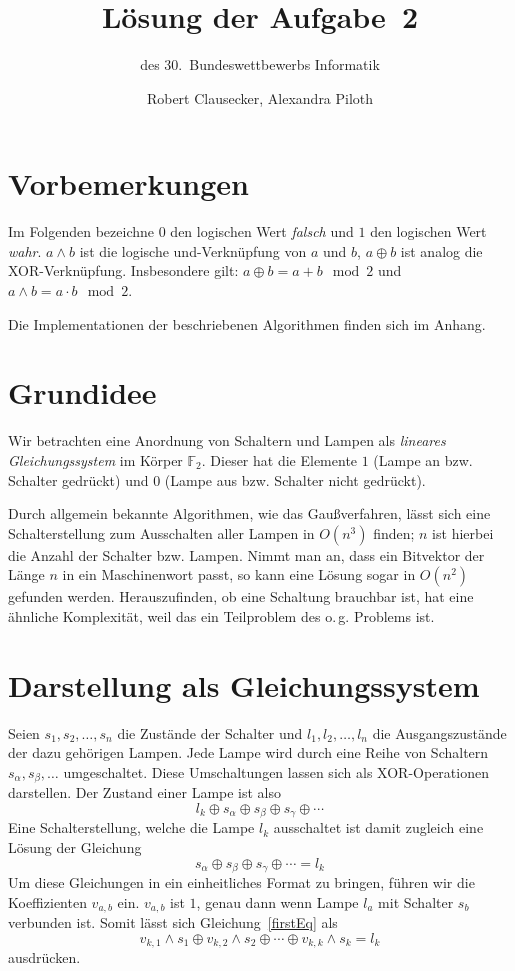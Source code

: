 \documentclass{scrartcl}
\title{Lösung der Aufgabe~2}
\subtitle{des 30.~Bundeswettbewerbs Informatik}
\author{Robert Clausecker, Alexandra Piloth}
\newcommand{\ftwo}{\ensuremath{\mathbb F_2}}
\newcommand{\bigO}{O}
\newcommand{\xor}{\oplus}
\begin{document}
\maketitle

\section*{Vorbemerkungen}
Im Folgenden bezeichne $0$ den logischen Wert \emph{falsch} und $1$ den
logischen Wert \emph{wahr}. $a\land b$ ist die logische und-Verknüpfung von $a$
und $b$, $a\xor b$ ist analog die XOR-Verknüpfung. Insbesondere gilt:
$a\xor b=a+b\mod 2$ und $a\land b=a\cdot b\mod 2$.

Die Implementationen der beschriebenen Algorithmen finden sich im Anhang.

\section{Grundidee}
Wir betrachten eine Anordnung von Schaltern und Lampen als \emph{lineares
Gleichungssystem} im Körper \ftwo.  Dieser hat die Elemente $1$ (Lampe an bzw.
Schalter gedrückt) und $0$ (Lampe aus bzw. Schalter nicht gedrückt).

Durch allgemein bekannte Algorithmen, wie das Gaußverfahren, lässt sich eine
Schalterstellung zum Ausschalten aller Lampen in $\bigO(n^3)$ finden; $n$ ist
hierbei die Anzahl der Schalter bzw. Lampen. Nimmt man an, dass ein Bitvektor
der Länge $n$ in ein Maschinenwort passt, so kann eine Lösung sogar in $\bigO(
n^2)$ gefunden werden. Herauszufinden, ob eine Schaltung brauchbar ist, hat eine
ähnliche Komplexität, weil das ein Teilproblem des o.\,g. Problems ist.

\section{Darstellung als Gleichungssystem}
Seien $s_1, s_2,\dots, s_n$ die Zustände der Schalter und $l_1, l_2,\dots,l_n$
die Ausgangszustände der dazu gehörigen Lampen. Jede Lampe wird durch eine Reihe
von Schaltern $s_\alpha, s_\beta,\dots$ umgeschaltet. Diese Umschaltungen lassen
sich als XOR-Operationen darstellen. Der Zustand einer Lampe ist also
\begin{equation}
l_k \xor s_\alpha \xor s_\beta \xor s_\gamma \xor \cdots
\end{equation}
Eine Schalterstellung, welche die Lampe $l_k$ ausschaltet ist damit zugleich
eine Lösung der Gleichung
\begin{equation}
s_\alpha \xor s_\beta \xor s_\gamma \xor \cdots = l_k\label{firstEq}
\end{equation}
Um diese Gleichungen in ein einheitliches Format zu bringen, führen
wir die Koeffizienten $v_{a,b}$ ein. $v_{a,b}$ ist $1$, genau dann wenn Lampe
$l_a$ mit Schalter $s_b$ verbunden ist. Somit lässt sich Gleichung~\ref{firstEq}
als
\begin{equation}
v_{k,1}\land s_1\xor v_{k,2}\land s_2\xor\cdots\xor v_{k,k}\land s_k=l_k
\end{equation}
ausdrücken.
\end{document}
